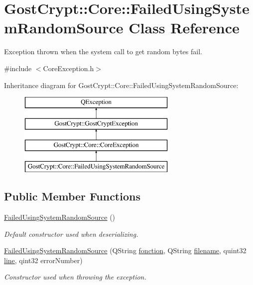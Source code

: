 \hypertarget{class_gost_crypt_1_1_core_1_1_failed_using_system_random_source}{}\section{Gost\+Crypt\+:\+:Core\+:\+:Failed\+Using\+System\+Random\+Source Class Reference}
\label{class_gost_crypt_1_1_core_1_1_failed_using_system_random_source}


Exception thrown when the system call to get random bytes fail.  




{\ttfamily \#include $<$Core\+Exception.\+h$>$}

Inheritance diagram for Gost\+Crypt\+:\+:Core\+:\+:Failed\+Using\+System\+Random\+Source\+:\begin{figure}[H]
\begin{center}
\leavevmode
\includegraphics[height=4.000000cm]{class_gost_crypt_1_1_core_1_1_failed_using_system_random_source}
\end{center}
\end{figure}
\subsection*{Public Member Functions}
\begin{DoxyCompactItemize}
\item 
\hyperlink{class_gost_crypt_1_1_core_1_1_failed_using_system_random_source_ac13b387b0577dfdd97a864450f160603}{Failed\+Using\+System\+Random\+Source} ()
\begin{DoxyCompactList}\small\item\em Default constructor used when deserializing. \end{DoxyCompactList}\item 
\hyperlink{class_gost_crypt_1_1_core_1_1_failed_using_system_random_source_ab40d5946fd862d18fe0a63fb87c00c1c}{Failed\+Using\+System\+Random\+Source} (Q\+String \hyperlink{class_gost_crypt_1_1_gost_crypt_exception_a29b8c93d5efbb1ff369107385725a939}{fonction}, Q\+String \hyperlink{class_gost_crypt_1_1_gost_crypt_exception_a749a12375f4ba9d502623b99d8252f38}{filename}, quint32 \hyperlink{class_gost_crypt_1_1_gost_crypt_exception_abf506d911f12a4e969eea500f90bd32c}{line}, qint32 error\+Number)
\begin{DoxyCompactList}\small\item\em Constructor used when throwing the exception. \end{DoxyCompactList}\end{DoxyCompactItemize}
